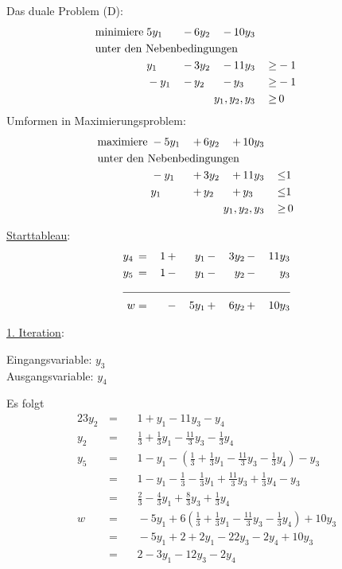 \documentclass[10pt,a4paper,oneside,ngerman,numbers=noenddot]{scrartcl}
\begin{document}
	\subsection{} %
		Das duale Problem (D):
		\begin{alignat*}{4}
			\text{minimiere}\; & 5y_{1} \,&-&\, 6y_{2} \,&-&\, 10y_{3} && \\
			\multicolumn{8}{l}{\text{unter den Nebenbedingungen}} && \\
			\;& y_{1} \,&-&\, 3y_{2} \,&-&\, 11y_{3} \,&\geq & -1 \\
			\;& -y_{1} \,&-&\, y_{2} \,&-&\, y_{3} \,&\geq & -1 \\
			\multicolumn{6}{r}{$y_{1}, y_{2}, y_{3}$} \,&\geq &\, 0
		\end{alignat*}
		Umformen in Maximierungsproblem:
		\begin{alignat*}{4}
			\text{maximiere}\; & -5y_{1} \,&+&\, 6y_{2} \,&+&\, 10y_{3} && \\
			\multicolumn{8}{l}{\text{unter den Nebenbedingungen}} && \\
			\;& -y_{1} \,&+&\, 3y_{2} \,&+&\, 11y_{3} \,&\leq & 1 \\
			\;& y_{1} \,&+&\, y_{2} \,&+&\, y_{3} \,&\leq & 1 \\
			\multicolumn{6}{r}{$y_{1}, y_{2}, y_{3}$} \,&\geq &\, 0
		\end{alignat*}
		
		\underline{Starttableau}:
		\begin{alignat*}{5}
			y_{4} \,&=&\, 1 \,&+&\, y_{1} \,&-&\, 3y_{2} \,&-&\, 11y_{3} \\
			y_{5} \,&=&\, 1 \,&-&\, y_{1} \,&-&\, y_{2} \,&-&\, y_{3} \\ \cline{1 - 9}
			w &=& &-&\, 5y_{1} \,&+&\, 6y_{2} \,&+&\, 10y_{3}
		\end{alignat*}
		
		\underline{1. Iteration}:
		
		Eingangsvariable: $y_{3}$\\
		Ausgangsvariable: $y_{4}$
		
		Es folgt
		\begin{alignat*}{2}
			3y_{2} \,&=&&\, 1 + y_{1}  - 11y_{3} - y_{4} \\
			y_{2} \,&=&&\, \frac{1}{3} + \frac{1}{3}y_{1} - \frac{11}{3}y_{3} - \frac{1}{3}y_{4} \\
			y_{5} \,&=&&\, 1 - y_{1} - \left(\frac{1}{3} + \frac{1}{3}y_{1} - \frac{11}{3}y_{3} - \frac{1}{3}y_{4}\right) - y_{3} \\
			&=&&\, 1 - y_{1} - \frac{1}{3} - \frac{1}{3}y_{1} + \frac{11}{3}y_{3} + \frac{1}{3}y_{4} - y_{3} \\
			&=&&\, \frac{2}{3} - \frac{4}{3}y_{1} + \frac{8}{3}y_{3} + \frac{1}{3}y_{4} \\
			w \,&=&&\, -5y_{1} + 6\left(\frac{1}{3} + \frac{1}{3}y_{1} - \frac{11}{3}y_{3} - \frac{1}{3}y_{4}\right) + 10y_{3} \\
			&=&&\, -5y_{1} + 2 + 2y_{1} - 22y_{3} - 2y_{4} + 10y_{3} \\
			&=&&\, 2 - 3y_{1} - 12y_{3} - 2y_{4}
		\end{alignat*}
		
\end{document}
